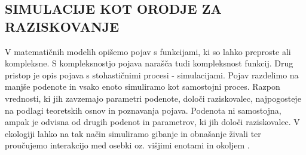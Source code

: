 \subsection{SIMULACIJE KOT ORODJE ZA RAZISKOVANJE}
V matematičnih modelih opišemo pojav s funkcijami, ki so lahko preproste ali kompleksne. S kompleksnostjo pojava narašča tudi kompleksnost funkcij. Drug pristop je opis pojava s stohastičnimi procesi - simulacijami. Pojav razdelimo na manjše podenote in vsako enoto simuliramo kot samostojni proces. Razpon vrednosti, ki jih zavzemajo parametri podenote, določi raziskovalec, najpogosteje na podlagi teoretskih osnov in poznavanja pojava. Podenota ni samostojna, ampak je odvisna od drugih podenot in parametrov, ki jih določi raziskovalec. V ekologiji lahko na tak način simuliramo gibanje in obnašanje živali ter proučujemo interakcijo med osebki oz. višjimi enotami in okoljem \citep{bolker_ecological_2008}.
